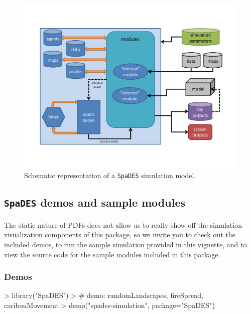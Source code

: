\documentclass{article}
\begin{document}
\begin{figure}[!htbp]
  \centering
	\includegraphics[width=5in]{../inst/SpaDES-overview-diagram.pdf}
	\caption{Schematic representation of a \texttt{SpaDES} simulation model.}
	\label{figure-SpaDES-overview}
\end{figure}

\subsection{\texttt{SpaDES} demos and sample modules}

\paragraph{}
The static nature of PDFs does not allow us to really show off the simulation visualization components of this package, so we invite you to check out the included demos, to run the sample simulation provided in this vignette, and to view the source code for the sample modules included in this package.

\subsubsection{Demos}

\begin{Schunk}
\begin{Sinput}
> library("SpaDES")
> # demo: randomLandscapes, fireSpread, caribouMovement
> demo("spades-simulation", package="SpaDES")
\end{Sinput}
\end{Schunk}
\end{document}
